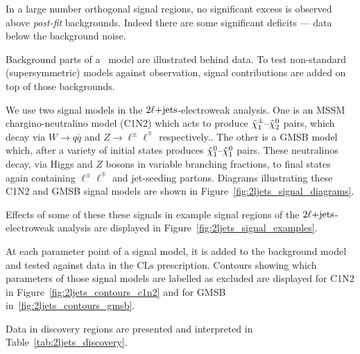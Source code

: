 In a large number orthogonal signal regions, no significant excess is observed
above \emph{post-fit} backgrounds.
Indeed there are some significant deficits --- data below the background noise.

Background parts of a \heplikelihood\ model are illustrated behind data.
To test non-standard (supersymmetric) models against observation, signal
contributions are added on top of those backgrounds.

We use two signal models in the $2\ell\mathrm{+jets}$-electroweak analysis.
One is an MSSM chargino-neutralino model (C1N2) which acts to produce
$\tilde\chi^\pm_1\textrm{--}\tilde\chi^0_2$ pairs, which decay via
$W\rightarrow q\bar q$ and
$Z\rightarrow \ell^\pm \ell^\mp$ respectively..
The other is a GMSB model which, after a variety of initial states produces
$\tilde\chi^0_1\textrm{--}\tilde\chi^0_1$ pairs.
These neutralinos decay,
via Higgs and $Z$ bosons in variable branching fractions,
to final states again containing $\ell^\pm \ell^\mp$ and jet-seeding partons.
Diagrams illustrating these C1N2 and GMSB signal models are shown in
Figure~\ref{fig:2ljets_signal_diagrams}.

Effects of some of these these signals in example signal regions of the
$2\ell\mathrm{+jets}$-electroweak analysis are displayed in
Figure~\ref{fig:2ljets_signal_examples}.

At each parameter point of a signal model, it is added to the background model
and tested against data in the $\mathrm{CLs}$ prescription.
Contours showing which parameters of those signal models are labelled as
excluded are displayed for
C1N2 in Figure~\ref{fig:2ljets_contours_c1n2} and for
GMSB in~\ref{fig:2ljets_contours_gmsb}.

Data in discovery regions are presented and interpreted in
Table~\ref{tab:2ljets_discovery}.



